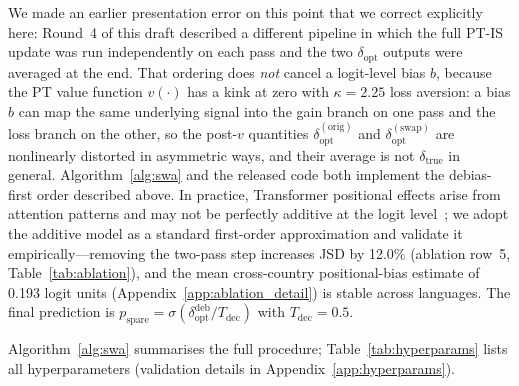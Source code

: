 \documentclass{article}
\begin{document}
We made an earlier presentation error on this point that we correct explicitly
here: Round~4 of this draft described a different pipeline in which the full
PT-IS update was run independently on each pass and the two $\delta_{\text{opt}}$
outputs were averaged at the end. That ordering does \emph{not} cancel a
logit-level bias $b$, because the PT value function $v(\cdot)$ has a kink at
zero with $\kappa{=}2.25$ loss aversion: a bias $b$ can map the same underlying
signal into the gain branch on one pass and the loss branch on the other, so
the post-$v$ quantities $\delta_{\text{opt}}^{(\text{orig})}$ and
$\delta_{\text{opt}}^{(\text{swap})}$ are nonlinearly distorted in asymmetric
ways, and their average is not $\delta_{\text{true}}$ in general.
Algorithm~\ref{alg:swa} and the released code both implement the
debias-first order described above.
In practice, Transformer positional effects arise from attention patterns and
may not be perfectly additive at the logit level~\citep{liu2024lost}; we adopt
the additive model as a standard first-order approximation and validate it
empirically---removing the two-pass step increases JSD by 12.0\% (ablation
row~5, Table~\ref{tab:ablation}), and the mean cross-country positional-bias
estimate of 0.193 logit units (Appendix~\ref{app:ablation_detail}) is stable
across languages. The final prediction is
$p_{\text{spare}} = \sigma(\delta_{\text{opt}}^{\text{deb}} / T_{\text{dec}})$
with $T_{\text{dec}}{=}0.5$.

Algorithm~\ref{alg:swa} summarises the full procedure; Table~\ref{tab:hyperparams}
lists all hyperparameters (validation details in Appendix~\ref{app:hyperparams}).
\end{document}
